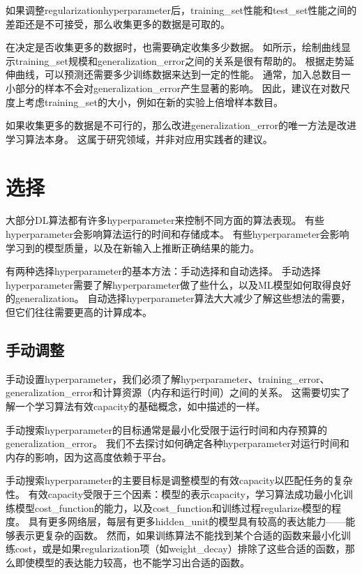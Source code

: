 如果调整\gls{regularization}\gls{hyperparameter}后，\gls{training_set}性能和\gls{test_set}性能之间的差距还是不可接受，那么收集更多的数据是可取的。


在决定是否收集更多的数据时，也需要确定收集多少数据。
如所示，绘制曲线显示\gls{training_set}规模和\gls{generalization_error}之间的关系是很有帮助的。
根据走势延伸曲线，可以预测还需要多少训练数据来达到一定的性能。
通常，加入总数目一小部分的样本不会对\gls{generalization_error}产生显著的影响。
因此，建议在对数尺度上考虑\gls{training_set}的大小，例如在新的实验上倍增样本数目。


如果收集更多的数据是不可行的，那么改进\gls{generalization_error}的唯一方法是改进学习算法本身。
这属于研究领域，并非对应用实践者的建议。

\section{选择}
\label{sec:selecting_hyperparameters}
大部分\gls{DL}算法都有许多\gls{hyperparameter}来控制不同方面的算法表现。
有些\gls{hyperparameter}会影响算法运行的时间和存储成本。
有些\gls{hyperparameter}会影响学习到的模型质量，以及在新输入上推断正确结果的能力。


有两种选择\gls{hyperparameter}的基本方法：手动选择和自动选择。
手动选择\gls{hyperparameter}需要了解\gls{hyperparameter}做了些什么，以及\gls{ML}模型如何取得良好的\gls{generalization}。
自动选择\gls{hyperparameter}算法大大减少了解这些想法的需要，但它们往往需要更高的计算成本。


\subsection{手动调整}
\label{sec:manual_hyperparameter_tuning}
手动设置\gls{hyperparameter}，我们必须了解\gls{hyperparameter}、\gls{training_error}、\gls{generalization_error}和计算资源（内存和运行时间）之间的关系。
这需要切实了解一个学习算法有效\gls{capacity}的基础概念，如中描述的一样。


手动搜索\gls{hyperparameter}的目标通常是最小化受限于运行时间和内存预算的\gls{generalization_error}。
我们不去探讨如何确定各种\gls{hyperparameter}对运行时间和内存的影响，因为这高度依赖于平台。


手动搜索\gls{hyperparameter}的主要目标是调整模型的有效\gls{capacity}以匹配任务的复杂性。
有效\gls{capacity}受限于三个因素：模型的表示\gls{capacity}，学习算法成功最小化训练模型\gls{cost_function}的能力，以及\gls{cost_function}和训练过程\gls{regularize}模型的程度。
具有更多网络层，每层有更多\gls{hidden_unit}的模型具有较高的表达能力——能够表示更复杂的函数。
然而，如果训练算法不能找到某个合适的函数来最小化训练\gls{cost}，或是如果\gls{regularization}项（如\gls{weight_decay}）排除了这些合适的函数，那么即使模型的表达能力较高，也不能学习出合适的函数。%

